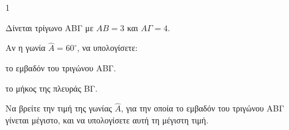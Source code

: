 \begin{ylh}{1}
    \item [Τριγωνομετρία]
\end{ylh}
\begin{figure}
    \centering
\end{figure}
Δίνεται τρίγωνο ΑΒΓ με $ΑΒ = 3$ και $ΑΓ = 4$.
\begin{alist}
    \item Αν η γωνία $\widehat{Α} = 60^\circ$, να υπολογίσετε:
        \begin{rlist}
            \item το εμβαδόν του τριγώνου ΑΒΓ. 
            \item το μήκος της πλευράς ΒΓ. 
        \end{rlist}
    \item Να βρείτε την τιμή της γωνίας $\widehat{Α}$, για την οποία το εμβαδόν του τριγώνου ΑΒΓ γίνεται μέγιστο, και να υπολογίσετε αυτή τη μέγιστη τιμή. 
\end{alist}